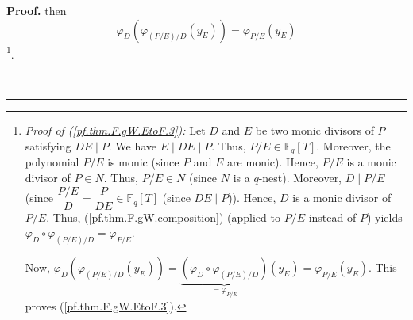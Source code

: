 \documentclass[numbers=enddot,12pt,final,onecolumn,notitlepage]{scrartcl}%
\theoremstyle{definition}
\newenvironment{proof}[1][Proof]{\noindent\textbf{#1.} }{\ \rule{0.5em}{0.5em}}
\begin{document}
\begin{proof}
then%
\begin{equation}
\varphi_{D}\left(  \varphi_{\left(  P/E\right)  /D}\left(  y_{E}\right)
\right)  =\varphi_{P/E}\left(  y_{E}\right)  \label{pf.thm.F.gW.EtoF.3}%
\end{equation}
\footnote{\textit{Proof of (\ref{pf.thm.F.gW.EtoF.3}):} Let $D$ and $E$ be two
monic divisors of $P$ satisfying $DE\mid P$. We have $E\mid DE\mid P$. Thus,
$P/E\in\mathbb{F}_{q}\left[  T\right]  $. Moreover, the polynomial $P/E$ is
monic (since $P$ and $E$ are monic). Hence, $P/E$ is a monic divisor of $P\in
N$. Thus, $P/E\in N$ (since $N$ is a $q$-nest). Moreover, $D\mid P/E$ (since
$\dfrac{P/E}{D}=\dfrac{P}{DE}\in\mathbb{F}_{q}\left[  T\right]  $ (since
$DE\mid P$)). Hence, $D$ is a monic divisor of $P/E$. Thus,
(\ref{pf.thm.F.gW.composition}) (applied to $P/E$ instead of $P$) yields
$\varphi_{D}\circ\varphi_{\left(  P/E\right)  /D}=\varphi_{P/E}$.
\par
Now, $\varphi_{D}\left(  \varphi_{\left(  P/E\right)  /D}\left(  y_{E}\right)
\right)  =\underbrace{\left(  \varphi_{D}\circ\varphi_{\left(  P/E\right)
/D}\right)  }_{=\varphi_{P/E}}\left(  y_{E}\right)  =\varphi_{P/E}\left(
y_{E}\right)  $. This proves (\ref{pf.thm.F.gW.EtoF.3}).}.


\end{proof}
\end{document}
